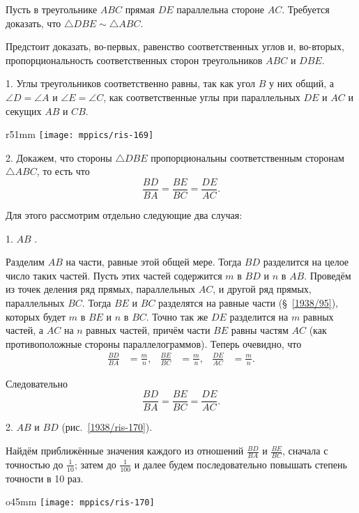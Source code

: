 Пусть в треугольнике $ABC$ прямая $DE$ параллельна стороне $AC$.
Требуется доказать, что $\triangle DBE\sim \triangle ABC$.

Предстоит доказать, во-первых, равенство соответственных углов и, во-вторых, пропорциональность соответственных сторон треугольников $ABC$ и $DBE$.

1.
Углы треугольников соответственно равны, так как угол $B$ у них общий, а $\angle D = \angle A$ и $\angle E= \angle C$, как соответственные углы при параллельных $DE$ и $AC$ и секущих $AB$ и $CB$.

\begin{wrapfigure}[13]{r}{51mm}
\centering
\texttt{[image: mppics/ris-169]}
\caption{}\label{1938/ris-169}
\end{wrapfigure}

2.
Докажем, что стороны $\triangle DBE$ пропорциональны соответственным сторонам $\triangle ABC$, то есть что
\[\frac{BD}{BA}=\frac{BE}{BC}=\frac{DE}{AC}.\]

Для этого рассмотрим отдельно следующие два случая:

1.
\mbox{} $AB$ .

Разделим $AB$ на части, равные этой общей мере.
Тогда $BD$ разделится на целое число таких частей.
Пусть этих частей содержится $m$ в $BD$ и $n$ в $AB$.
Проведём из точек деления ряд прямых, параллельных $AC$, и другой ряд прямых, параллельных $BC$.
Тогда $BE$ и $BC$ разделятся на равные части (§~\ref{1938/95}), которых будет $m$ в $BE$ и $n$ в $BC$.
Точно так же $DE$ разделится на $m$ равных частей, а $AC$ на $n$ равных частей, причём части $BE$ равны частям $AC$ (как противоположные стороны параллелограммов).
Теперь очевидно, что
\begin{align*}
\frac{BD}{BA}&=\frac mn,
&
\frac{BE}{BC}&=\frac mn,
&
\frac{DE}{AC}&=\frac mn.
\end{align*}



Следовательно
\[\frac{BD}{BA}=\frac{BE}{BC}=\frac{DE}{AC}.\]

2.  $AB$ и $BD$  (рис.~\ref{1938/ris-170}).

Найдём приближённые значения каждого из отношений $\frac{BD}{BA}$ и $\frac{BE}{BC}$, сначала с точностью до $\tfrac1{10}$;
затем до $\tfrac1{100}$ и далее будем последовательно повышать степень точности в 10 раз.

\begin{wrapfigure}{o}{45mm}
\centering
\texttt{[image: mppics/ris-170]}
\caption{}\label{1938/ris-170}
\end{wrapfigure}

